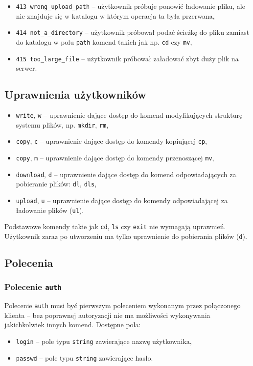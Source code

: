\documentclass[8pt,a4paper]{article}
\begin{document}
\begin{itemize}
    \item \texttt{413 wrong\_upload\_path} -- użytkownik próbuje ponowić ładowanie pliku, ale nie znajduje się w katalogu w którym operacja ta była przerwana,
    \item \texttt{414 not\_a\_directory} -- użytkownik próbował podać ścieżkę do pliku zamiast do katalogu w polu \texttt{path} komend takich jak np. \texttt{cd} czy \texttt{mv},
    \item \texttt{415 too\_large\_file} -- użytkownik próbował załadować zbyt duży plik na serwer.
\end{itemize}

\subsection{Uprawnienia użytkowników}
\begin{itemize}
    \item \texttt{write}, \texttt{w} -- uprawnienie dające dostęp do komend modyfikujących strukturę systemu plików, np. \texttt{mkdir}, \texttt{rm},
    \item \texttt{copy}, \texttt{c} -- uprawnienie dające dostęp do komendy kopiującej \texttt{cp},
    \item \texttt{copy}, \texttt{m} -- uprawnienie dające dostęp do komendy przenoszącej \texttt{mv},
    \item \texttt{download}, \texttt{d} -- uprawnienie dające dostęp do komend odpowiadających za pobieranie plików: \texttt{dl}, \texttt{dls},
    \item \texttt{upload}, \texttt{u} -- uprawnienie dające dostęp do komendy odpowiadającej za ładowanie plików (\texttt{ul}).
\end{itemize}
Podstawowe komendy takie jak \texttt{cd}, \texttt{ls} czy \texttt{exit} nie wymagają uprawnień. Użytkownik zaraz po utworzeniu ma tylko uprawnienie do pobierania plików (\texttt{d}).

\subsection{Polecenia}

\subsubsection{Polecenie \texttt{auth}}
Polecenie \texttt{auth} musi być pierwszym poleceniem wykonanym przez połączonego klienta -- bez poprawnej autoryzacji nie ma możliwości wykonywania jakichkolwiek innych komend. Dostępne pola:
\begin{itemize}
    \item \texttt{login} -- pole typu \texttt{string} zawierające nazwę użytkownika,
    \item \texttt{passwd} -- pole typu \texttt{string} zawierające hasło.
\end{itemize}
\end{document}
